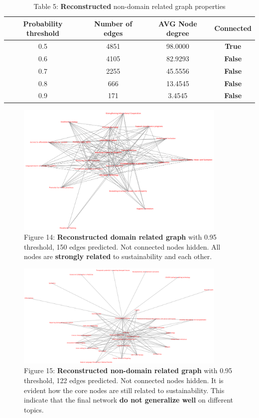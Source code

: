 \documentclass[11pt]{article}
\begin{document}
	\begin{table}[h!]
		\centering
		\begin{tabular}{cccc}
			\toprule
			Probability threshold & Number of edges & AVG \textbf{Node degree} & \textbf{Connected} \\
			\midrule
			0.5 & 4851 & 98.0000 & \textbf{True}\\
			0.6 & 4105 & 82.9293 & \textbf{False} \\
			0.7 & 2255 & 45.5556 &  \textbf{False} \\
			0.8 & 666  & 13.4545 & \textbf{False} \\
			0.9 & 171  & 3.4545  & \textbf{False} \\
			\bottomrule
		\end{tabular}
		\caption{Table 5: \textbf{Reconstructed} non-domain related graph properties}
		\label{table_5}
	\end{table}
	
	\begin{figure}[h!]
		\centering
		\includegraphics[width=0.9\textwidth]{images/domain_related_95_core.png}
		\caption{Figure 14: \textbf{Reconstructed domain related graph} with 0.95 threshold, 150 edges predicted. Not connected nodes hidden. All nodes are \textbf{strongly related} to sustainability and each other.}
		\label{figure_14}
	\end{figure}
	

	\begin{figure}[h!]
		\centering
		\includegraphics[width=0.9\textwidth]{images/non_domain_95_core.png}
		\caption{Figure 15: \textbf{Reconstructed non-domain related graph} with 0.95 threshold, 122 edges predicted. Not connected nodes hidden. It is evident how the core nodes are still related to sustainability. This indicate that the final network \textbf{do not generalize well} on different topics.}
		\label{figure_15}
	\end{figure}
\end{document}

